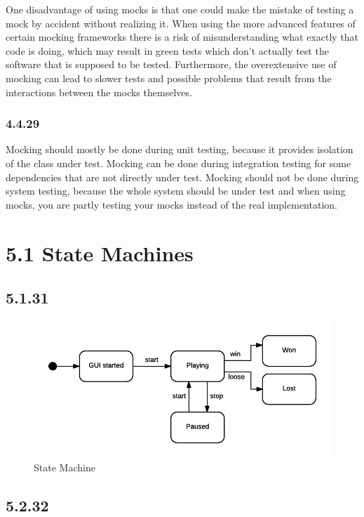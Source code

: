 \documentclass[]{article}
\begin{document}
One disadvantage of using mocks is that one could make the mistake of
testing a mock by accident without realizing it. When using the more
advanced features of certain mocking frameworks there is a risk of
misunderstanding what exactly that code is doing, which may result in
green tests which don't actually test the software that is supposed to
be tested. Furthermore, the overextensive use of mocking can lead to
slower tests and possible problems that result from the interactions
between the mocks themselves.

\subsubsection{4.4.29}\label{section-18}

Mocking should mostly be done during unit testing, because it provides
isolation of the class under test. Mocking can be done during
integration testing for some dependencies that are not directly under
test. Mocking should not be done during system testing, because the
whole system should be under test and when using mocks, you are partly
testing your mocks instead of the real implementation.

\section{5.1 State Machines}\label{state-machines}

\subsection{5.1.31}\label{section-19}

\begin{figure}
\centering
\includegraphics{5.1.31.png}
\caption{State Machine}
\end{figure}

\subsection{5.2.32}\label{section-20}
\end{document}
